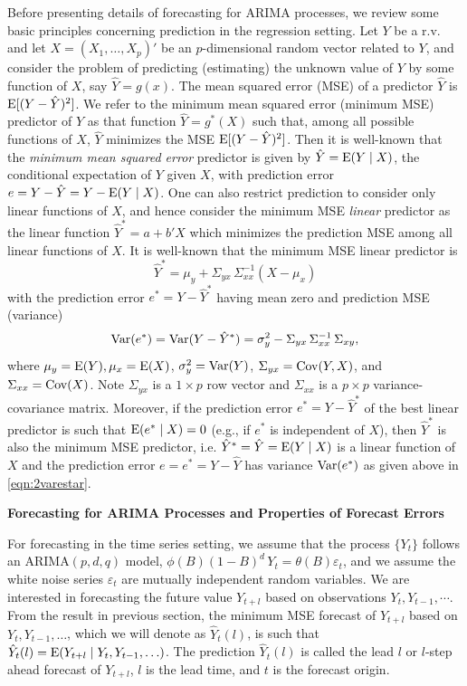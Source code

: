 Before presenting details of forecasting for ARIMA processes, we review some basic principles concerning prediction in the regression setting. Let $Y$ be a r.v. and let $X = (X_1, \ldots, X_p)'$ be an $p$-dimensional random vector related to $Y$, and consider the problem of predicting (estimating) the unknown value of $Y$ by some function of $X$, say $\hat{Y} = g(x)$. The mean squared error (MSE) of a predictor $\hat{Y}$ is $\operatorname{E}[(Y - \hat{Y})^2]$. We refer to the minimum mean squared error (minimum MSE) predictor of $Y$ as that function $\hat{Y} = g^*(X)$ such that, among all possible functions of $X$, $\hat{Y}$ minimizes the MSE $\operatorname{E}[(Y - \hat{Y})^2]$. Then it is well-known that the \emph{minimum mean squared error} predictor is given by $\hat{Y} = \operatorname{E}(Y\;|\;X)$, the conditional expectation of $Y$ given $X$, with prediction error $e = Y - \hat{Y} = Y - \operatorname{E}(Y\;|\;X)$. One can also restrict prediction to consider only linear functions of $X$, and hence consider the minimum MSE \emph{linear} predictor as the linear function $\hat{Y}^* = a + b' X$ which minimizes the prediction MSE among all linear functions of $X$. It is well-known that the minimum MSE linear predictor is
	\begin{equation} \label{eqn:2yhatstar}
	\hat{Y}^* = \mu_y + \Sigma_{yx}\,\Sigma_{xx}^{-1}(X - \mu_x)
	\end{equation}
with the prediction error $e^* = Y - \hat{Y}^*$ having mean zero and prediction MSE (variance)
	\begin{equation} \label{eqn:2varestar}
	\var(e^*) = \var(Y - \hat{Y}^*) = \sigma_y^2 - \Sigma_{yx}\,\Sigma_{xx}^{-1}\,\Sigma_{xy},
	\end{equation}
where $\mu_y = \operatorname{E}(Y), \mu_x = \operatorname{E}(X)$, $\sigma_y^2 = \operatorname{Var}(Y)$, $\Sigma_{yx} = \operatorname{Cov}(Y,X)$, and $\Sigma_{xx} = \operatorname{Cov}(X)$. Note $\Sigma_{yx}$ is a $1 \times p$ row vector and $\Sigma_{xx}$ is a $p \times p$ variance-covariance matrix. Moreover, if the prediction error $e^* = Y - \hat{Y}^*$ of the best linear predictor is such that $\operatorname{E}(e^*\;|\;X) = 0$ (e.g., if $e^*$ is independent of $X$), then $\hat{Y}^*$ is also the minimum MSE predictor, i.e. $\hat{Y}^* = \hat{Y} = \operatorname{E}(Y\;|\;X)$ is a linear function of $X$ and the prediction error $e = e^* = Y - \hat{Y}$ has variance $\operatorname{Var}(e^*)$ as given above in \eqref{eqn:2varestar}. \twomedskip


\noindent\textbf{Forecasting for ARIMA Processes and Properties of Forecast Errors} \twomedskip


For forecasting in the time series setting, we assume that the process $\{ Y_t \}$ follows an ARIMA$(p,d,q)$ model, $\phi(B)(1 - B)^d\,  Y_t = \theta(B) \varepsilon_t$, and we assume the white noise series $\varepsilon_t$ are mutually independent random variables. We are interested in forecasting the future value $Y_{t+l}$ based on observations $Y_t,Y_{t-1},\cdots$. From the result in previous section, the minimum MSE forecast of $Y_{t+l}$ based on $Y_t, Y_{t-1}, \ldots$, which we will denote as $\hat{Y}_t(l)$, is such that $\hat{Y}_t(l) = \operatorname{E}(Y_{t+l} \;|\; Y_t,Y_{t-1},\ldots)$. The prediction $\hat{Y}_t(l)$ is called the lead $l$ or $l$-step ahead forecast of $Y_{t+l}$, $l$ is the lead time, and $t$ is the forecast origin.


